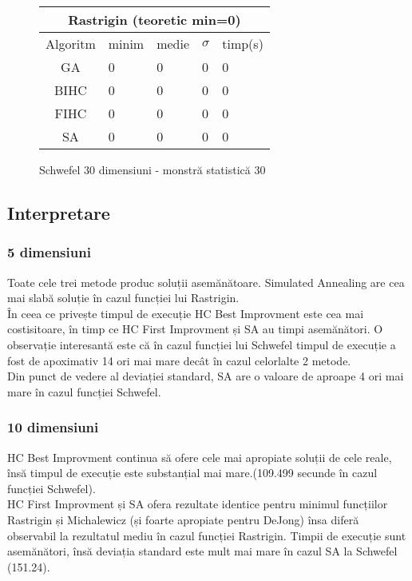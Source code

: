 \documentclass{article}
\begin{document}
\begin{figure}[!h]
\begin{tabular}{||c|||l|l|l|l||}
  \hline
  \multicolumn{5}{||c||}{Rastrigin (teoretic min=0)} \\ \hline
  Algoritm & minim & medie & $\sigma$ & timp(s) \\ \hline \hline
  GA & 0 & 0 & 0 & 0 \\ \hline
  BIHC & 0 & 0 & 0 & 0\\ \hline
  FIHC & 0 & 0 & 0 & 0 \\ \hline
  SA & 0 & 0 & 0 & 0 \\ \hline
\end{tabular}
\caption{Schwefel 30 dimensiuni - monstră statistică 30} 
\end{figure}


\subsection{Interpretare}
\subsubsection{5 dimensiuni}
Toate cele trei metode produc soluții asemănătoare. Simulated Annealing are cea mai slabă soluție în cazul funcției lui Rastrigin.\\
În ceea ce privește timpul de execuție HC Best Improvment este cea mai costisitoare, în timp ce HC First Improvment și SA au timpi asemănători.
O observație interesantă este că în cazul funcției lui Schwefel timpul de execuție a fost de apoximativ 14 ori mai mare decât în cazul celorlalte 2 metode.\\
Din punct de vedere al deviației standard, SA are o valoare de aproape 4 ori mai mare în cazul funcției Schwefel.

\subsubsection{10 dimensiuni}
HC Best Improvment continua să ofere cele mai apropiate soluții de cele reale, însă timpul de execuție este substanțial mai mare.(109.499 secunde în cazul funcției Schwefel).\\
HC First Improvment și SA ofera rezultate identice pentru minimul funcțiilor Rastrigin și Michalewicz (și foarte apropiate pentru DeJong) însa diferă observabil la rezultatul mediu în cazul funcției Rastrigin. Timpii de execuție sunt asemănători, însă deviația standard este mult mai mare în cazul SA la Schwefel (151.24).
\end{document}
